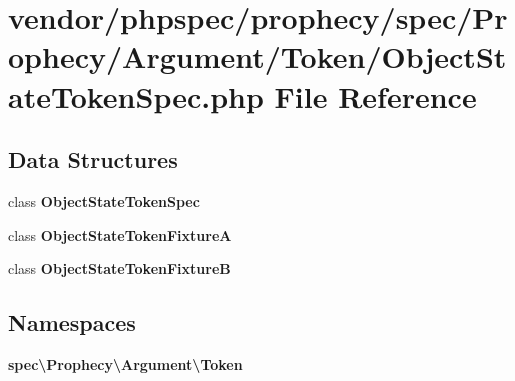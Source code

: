 \section{vendor/phpspec/prophecy/spec/\+Prophecy/\+Argument/\+Token/\+Object\+State\+Token\+Spec.php File Reference}
\label{_object_state_token_spec_8php}
\subsection*{Data Structures}
\begin{DoxyCompactItemize}
\item 
class {\bf Object\+State\+Token\+Spec}
\item 
class {\bf Object\+State\+Token\+Fixture\+A}
\item 
class {\bf Object\+State\+Token\+Fixture\+B}
\end{DoxyCompactItemize}
\subsection*{Namespaces}
\begin{DoxyCompactItemize}
\item 
 {\bf spec\textbackslash{}\+Prophecy\textbackslash{}\+Argument\textbackslash{}\+Token}
\end{DoxyCompactItemize}
